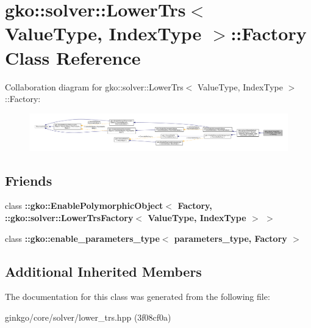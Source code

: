 \hypertarget{classgko_1_1solver_1_1LowerTrs_1_1Factory}{}\section{gko\+:\+:solver\+:\+:Lower\+Trs$<$ Value\+Type, Index\+Type $>$\+:\+:Factory Class Reference}
\label{classgko_1_1solver_1_1LowerTrs_1_1Factory}


Collaboration diagram for gko\+:\+:solver\+:\+:Lower\+Trs$<$ Value\+Type, Index\+Type $>$\+:\+:Factory\+:
\nopagebreak
\begin{figure}[H]
\begin{center}
\leavevmode
\includegraphics[width=350pt]{classgko_1_1solver_1_1LowerTrs_1_1Factory__coll__graph}
\end{center}
\end{figure}
\subsection*{Friends}
\begin{DoxyCompactItemize}
\item 
\mbox{\label{classgko_1_1solver_1_1LowerTrs_1_1Factory_af60b3c32eeaca3a3507f8b689002ef17}} 
class {\bfseries \+::gko\+::\+Enable\+Polymorphic\+Object$<$ Factory, \+::gko\+::solver\+::\+Lower\+Trs\+Factory$<$ Value\+Type, Index\+Type $>$ $>$}
\item 
\mbox{\label{classgko_1_1solver_1_1LowerTrs_1_1Factory_a0d176cbd42d6214e11aee8c30ca256fc}} 
class {\bfseries \+::gko\+::enable\+\_\+parameters\+\_\+type$<$ parameters\+\_\+type, Factory $>$}
\end{DoxyCompactItemize}
\subsection*{Additional Inherited Members}


The documentation for this class was generated from the following file\+:\begin{DoxyCompactItemize}
\item 
ginkgo/core/solver/lower\+\_\+trs.\+hpp (3f08cf0a)\end{DoxyCompactItemize}
